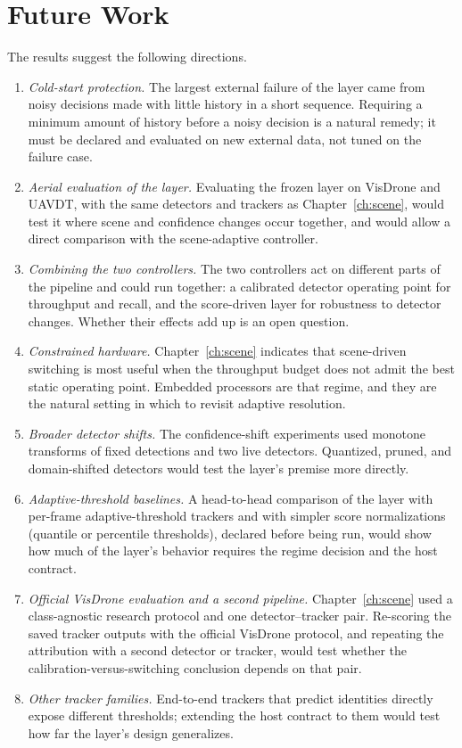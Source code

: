 \section{Future Work}\label{sec:c-future}
The results suggest the following directions.
\begin{enumerate}
\item \emph{Cold-start protection.} The largest external failure of the layer came from noisy decisions made with little history in a short sequence. Requiring a minimum amount of history before a noisy decision is a natural remedy; it must be declared and evaluated on new external data, not tuned on the failure case.
\item \emph{Aerial evaluation of the layer.} Evaluating the frozen layer on VisDrone and UAVDT, with the same detectors and trackers as Chapter~\ref{ch:scene}, would test it where scene and confidence changes occur together, and would allow a direct comparison with the scene-adaptive controller.
\item \emph{Combining the two controllers.} The two controllers act on different parts of the pipeline and could run together: a calibrated detector operating point for throughput and recall, and the score-driven layer for robustness to detector changes. Whether their effects add up is an open question.
\item \emph{Constrained hardware.} Chapter~\ref{ch:scene} indicates that scene-driven switching is most useful when the throughput budget does not admit the best static operating point. Embedded processors are that regime, and they are the natural setting in which to revisit adaptive resolution.
\item \emph{Broader detector shifts.} The confidence-shift experiments used monotone transforms of fixed detections and two live detectors. Quantized, pruned, and domain-shifted detectors would test the layer's premise more directly.
\item \emph{Adaptive-threshold baselines.} A head-to-head comparison of the layer with per-frame adaptive-threshold trackers \cite{ma2023adaptivebytetrack,shim2024adaptrack,act2026adaptive} and with simpler score normalizations (quantile or percentile thresholds), declared before being run, would show how much of the layer's behavior requires the regime decision and the host contract.
\item \emph{Official VisDrone evaluation and a second pipeline.} Chapter~\ref{ch:scene} used a class-agnostic research protocol and one detector--tracker pair. Re-scoring the saved tracker outputs with the official VisDrone protocol, and repeating the attribution with a second detector or tracker, would test whether the calibration-versus-switching conclusion depends on that pair.
\item \emph{Other tracker families.} End-to-end trackers that predict identities directly \cite{zeng2022motr,gao2025motip} expose different thresholds; extending the host contract to them would test how far the layer's design generalizes.
\end{enumerate}


